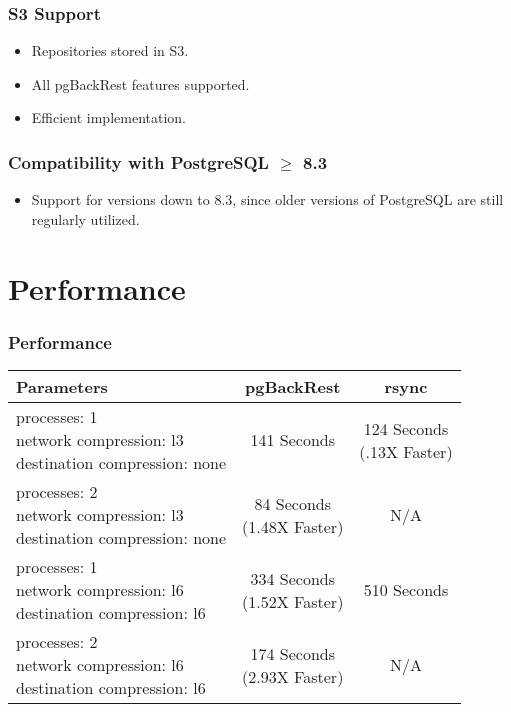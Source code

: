 \begin{frame}
    \frametitle{S3 Support}

    \begin{itemize}
        \item Repositories stored in S3.\pause
        \item All pgBackRest features supported.\pause
        \item Efficient implementation.
    \end{itemize}
\end{frame}

\begin{frame}
    \frametitle{Compatibility with PostgreSQL $\geqslant$ 8.3}

    \begin{itemize}
        \item Support for versions down to 8.3, since older versions of PostgreSQL are still regularly utilized.
    \end{itemize}
\end{frame}

\section{Performance}

\begin{frame}
    \frametitle{Performance}

    \begin{table}
        \begin{tabular}{l || c | c}
            \bf{Parameters} & \bf{pgBackRest} & \bf{rsync} \\
            \hline \hline
            \pbox{14em}{processes: 1 \\ network compression: l3 \\ destination compression: none} &
                141 Seconds &
                \pbox{14em}{124 Seconds \\ (.13X Faster)} \\ \hline
            \pbox{14em}{processes: 2 \\ network compression: l3 \\ destination compression: none} &
                \pbox{14em}{84 Seconds \\ (1.48X Faster)} &
                N/A \\ \hline
            \pbox{14em}{processes: 1 \\ network compression: l6 \\ destination compression: l6} &
                \pbox{14em}{334 Seconds \\ (1.52X Faster)} &
                510 Seconds \\ \hline
            \pbox{14em}{processes: 2 \\ network compression: l6 \\ destination compression: l6} &
                \pbox{14em}{174 Seconds \\ (2.93X Faster)} &
                N/A
        \end{tabular}
    \end{table}

\end{frame}

